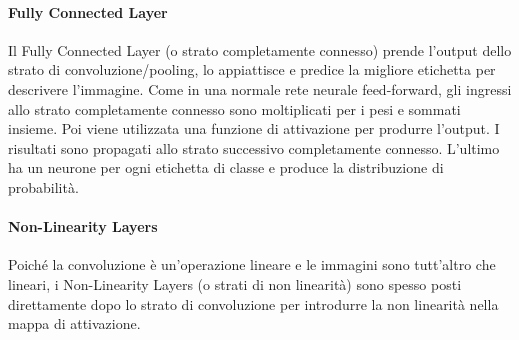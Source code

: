         \paragraph{Fully Connected Layer}
        Il Fully Connected Layer (o strato completamente connesso) prende l'output dello strato di convoluzione/pooling, lo appiattisce e predice la migliore etichetta per descrivere l'immagine. Come in una normale rete neurale feed-forward, gli ingressi allo strato completamente connesso sono moltiplicati per i pesi e sommati insieme. Poi viene utilizzata una funzione di attivazione  per produrre l'output. I risultati sono propagati allo strato successivo completamente connesso. L'ultimo ha un neurone per ogni etichetta di classe e produce la distribuzione di probabilità.

        \paragraph{Non-Linearity Layers}
        Poiché la convoluzione è un'operazione lineare e le immagini sono tutt'altro che lineari, i Non-Linearity Layers (o strati di non linearità) sono spesso posti direttamente dopo lo strato di convoluzione per introdurre la non linearità nella mappa di attivazione.\\
        
